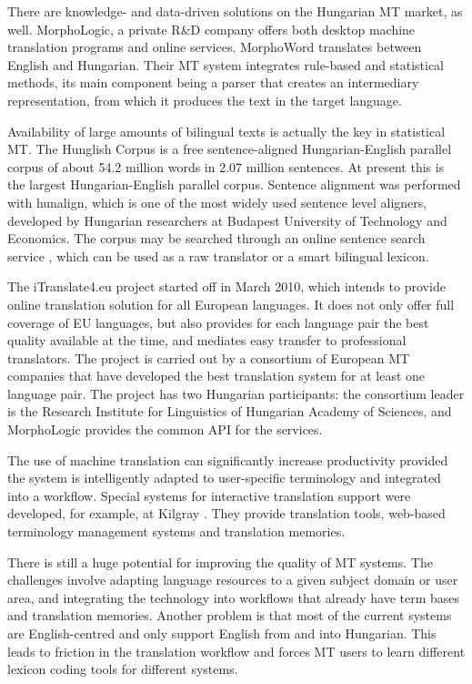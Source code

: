 \begin{multicols}{2}
There are knowledge- and data-driven solutions on the Hungarian MT market, as well. MorphoLogic, a private R\&D company offers both desktop machine translation programs and online services. MorphoWord translates between English and Hungarian. Their MT system integrates rule-based and statistical methods, its main component being a parser that creates an intermediary representation, from which it produces the text in the target language.

Availability of large amounts of bilingual texts is actually the key in statistical MT. The Hunglish Corpus is a free sentence-aligned Hungarian-English parallel corpus of about 54.2 million words in 2.07 million sentences. At present this is the largest Hungarian-English parallel corpus. Sentence alignment was performed with hunalign, which is one of the most widely used sentence level aligners, developed by Hungarian researchers at Budapest University of Technology and Economics. The corpus may be searched through an online sentence search service \cite{hunglish}, which can be used as a raw translator or a smart bilingual lexicon.

The iTranslate4.eu \cite{it4eu} project started off in March 2010, which intends to provide online translation solution for all European languages. It does not only offer full coverage of EU languages, but also provides for each language pair the best quality available at the time, and mediates easy transfer to professional translators. The project is carried out by a consortium of European MT companies that have developed the best translation system for at least one language pair. The project has two Hungarian participants: the consortium leader is the Research Institute for Linguistics of Hungarian Academy of Sciences, and MorphoLogic provides the common API for the services.

The use of machine translation can significantly increase productivity provided the system is intelligently adapted to user-specific terminology and integrated into a workflow. Special systems for interactive translation support were developed, for example, at Kilgray \cite{memoq}. They provide translation tools, web-based terminology management systems and translation memories.

There is still a huge potential for improving the quality of MT systems. The challenges involve adapting language resources to a given subject domain or user area, and integrating the technology into workflows that already have term bases and translation memories. Another problem is that most of the current systems are English-centred and only support English from and into Hungarian. This leads to friction in the translation workflow and forces MT users to learn different lexicon coding tools for different systems.


\end{multicols}
